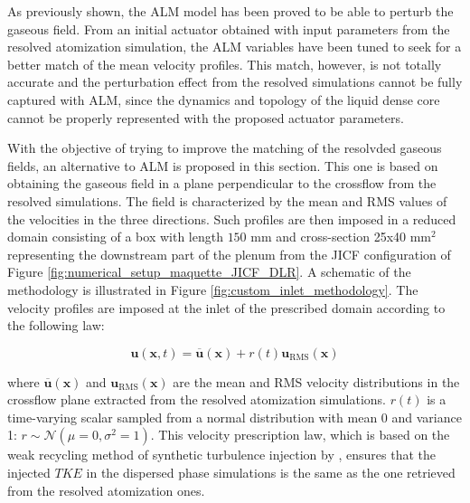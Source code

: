 

As previously shown, the ALM model has been proved to be able to perturb the gaseous field. From an initial actuator obtained with input parameters from the resolved atomization simulation, the ALM variables have been tuned to seek for a better match of the mean velocity profiles. This match, however, is not totally accurate and the perturbation effect from the resolved simulations cannot be fully captured with ALM, since the dynamics and topology of the liquid dense core cannot be properly represented with the proposed actuator parameters. 

With the objective of trying to improve the matching of the resolvded gaseous fields, an alternative to ALM is proposed in this section. This one is based on obtaining the gaseous field in a plane perpendicular to the crossflow from the resolved simulations. The field is characterized by the mean and RMS values of the velocities in the three directions. Such profiles are then imposed in a reduced domain consisting of a box with length $150$ mm and cross-section 25x40 mm$^2$ representing the downstream part of the plenum from the JICF configuration of Figure \ref{fig:numerical_setup_maquette_JICF_DLR}. A schematic of the methodology is illustrated in Figure \ref{fig:custom_inlet_methodology}. The velocity profiles are imposed at the inlet of the prescribed domain according to the following law:

\begin{equation}
\label{eq:prescribed_inlet_u_gas_injection_law}
\textbf{u} \left( \textbf{x}, t \right) = \overline{\textbf{u}} \left( \textbf{x} \right)  + r \left( t \right)  \textbf{u}_\mathrm{RMS} \left( \textbf{x} \right) 
\end{equation}

where $\overline{\textbf{u}} \left( \textbf{x} \right)$ and $\textbf{u}_\mathrm{RMS} \left( \textbf{x} \right)$ are the mean and RMS velocity distributions in the crossflow plane extracted from the resolved atomization simulations. $r \left( t \right)$ is a time-varying scalar sampled from a normal distribution with mean 0 and variance 1: $r \sim \mathcal{N} \left( \mu = 0, \sigma^2 = 1 \right)$. This velocity prescription law, which is based on the weak recycling method of synthetic turbulence injection by \citeColor[wu_large_1995], ensures that the injected $TKE$ in the dispersed phase simulations is the same as the one retrieved from the resolved atomization ones. %

